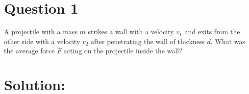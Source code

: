 \section*{Question 1}
A projectile with a mass $m$ strikes a wall with a velocity $v_1$ and exits from the other side with a velocity $v_2$ after penetrating the wall of thickness $d$. What was the average force $F$ acting on the projectile inside the wall? 

\section*{Solution:}